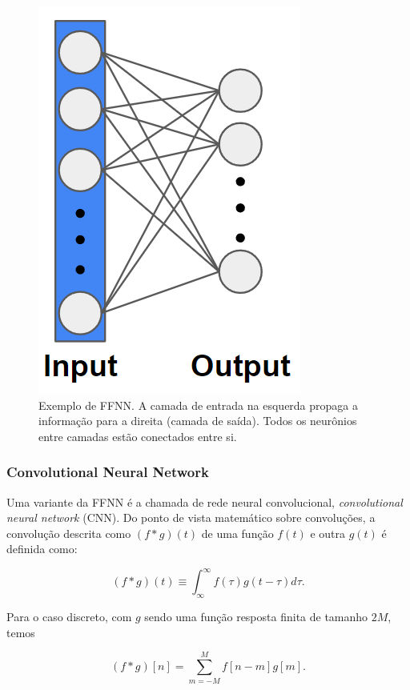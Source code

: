 \documentclass[a4paper,12pt,oneside]{book}
\begin{document}
\begin{figure}[H]
    \centering
    \includegraphics[scale = 0.55]{figs/FFNN.png}
    \caption{Exemplo de FFNN. A camada de entrada na esquerda propaga a informação para a direita (camada de saída). Todos os neurônios entre camadas estão conectados entre si.}
    \label{fig:FFNN}
\end{figure}

\subsubsection*{Convolutional Neural Network}

\par Uma variante da FFNN é a chamada de rede neural convolucional, \textit{convolutional neural network} (CNN). Do ponto de vista matemático sobre convoluções, a convolução descrita como $(f*g)(t)$ de uma função $f(t)$ e outra $g(t)$ é definida como:

\begin{equation}\label{eq:conv_cont}
    (f*g)(t) \equiv \int^{\infty}_{\infty} f(\tau)g(t - \tau)d\tau.
\end{equation}

Para o caso discreto, com $g$ sendo uma função resposta finita de tamanho $2M$, temos

\begin{equation}\label{eq:conv_disc}
    (f*g)[n] = \sum^{M}_{m = -M} f[n - m]g[m]. 
\end{equation}
\end{document}
